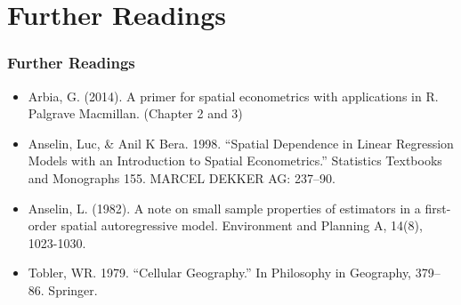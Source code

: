 \documentclass[
  shownotes,
  xcolor={svgnames},
  hyperref={colorlinks,citecolor=DarkBlue,linkcolor=DarkRed,urlcolor=DarkBlue}
  ]{beamer}
\begin{document}
\section{Further Readings}
\begin{frame}
\frametitle{Further Readings}

\begin{itemize}

   
  \item Arbia, G. (2014). A primer for spatial econometrics with applications in R. Palgrave Macmillan. (Chapter 2 and 3)
  \medskip
  \item Anselin, Luc, \& Anil K Bera. 1998. “Spatial Dependence in Linear Regression Models with an Introduction to Spatial Econometrics.” Statistics Textbooks and Monographs 155. MARCEL DEKKER AG: 237–90.
  \medskip
  \item Anselin, L. (1982). A note on small sample properties of estimators in a first-order spatial autoregressive model. Environment and Planning A, 14(8), 1023-1030.
  \medskip
  \item Tobler, WR. 1979. “Cellular Geography.” In Philosophy in Geography, 379–86. Springer.
\end{itemize}

\end{frame}






\end{document}
